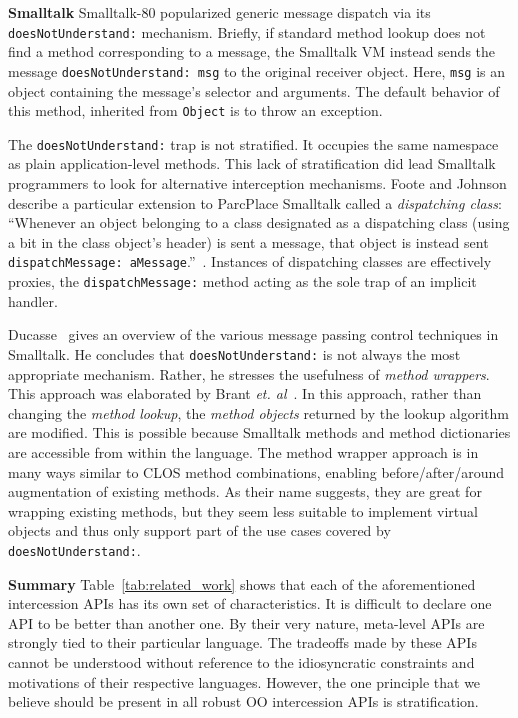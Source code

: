 \documentclass{acm_proc_article-sp}
\begin{document}
\textbf{Smalltalk} Smalltalk-80 popularized generic message dispatch via its \texttt{doesNotUnderstand:} mechanism. Briefly, if standard method lookup does not find a method corresponding to a message, the Smalltalk VM instead sends the message \texttt{doesNotUnderstand: msg} to the original receiver object. Here, \texttt{msg} is an object containing the message's selector and arguments. The default behavior of this method, inherited from \texttt{Object} is to throw an exception.

The \texttt{doesNotUnderstand:} trap is not stratified. It occupies the same namespace as plain application-level methods. This lack of stratification did lead Smalltalk programmers to look for alternative interception mechanisms. Foote and Johnson describe a particular extension to ParcPlace Smalltalk called a \emph{dispatching class}: ``Whenever an object belonging to a class designated as a dispatching class (using a bit in the class object's header) is sent a message, that object is instead sent \texttt{dispatchMessage: aMessage}.''~\cite{foote89reflective}. Instances of dispatching classes are effectively proxies, the \texttt{dispatchMessage:} method acting as the sole trap of an implicit handler.

Ducasse~\cite{ducasse99evaluatingmessage} gives an overview of the various message passing control techniques in Smalltalk. He concludes that \texttt{doesNotUnderstand:} is not always the most appropriate mechanism. Rather, he stresses the usefulness of \emph{method wrappers}. This approach was elaborated by Brant \emph{et. al}~\cite{brant98wrappers}. In this approach, rather than changing the \emph{method lookup}, the \emph{method objects} returned by the lookup algorithm are modified. This is possible because Smalltalk methods and method dictionaries are accessible from within the language. The method wrapper approach is in many ways similar to CLOS method combinations, enabling before/after/around augmentation of existing methods. As their name suggests, they are great for wrapping existing methods, but they seem less suitable to implement virtual objects and thus only support part of the use cases covered by \texttt{doesNotUnderstand:}.

\textbf{Summary} Table~\ref{tab:related_work} shows that each of the aforementioned intercession APIs has its own set of characteristics. It is difficult to declare one API to be better than another one. By their very nature, meta-level APIs are strongly tied to their particular language. The tradeoffs made by these APIs cannot be understood without reference to the idiosyncratic constraints and motivations of their respective languages. However, the one principle that we believe should be present in all robust OO intercession APIs is stratification.
\end{document}
